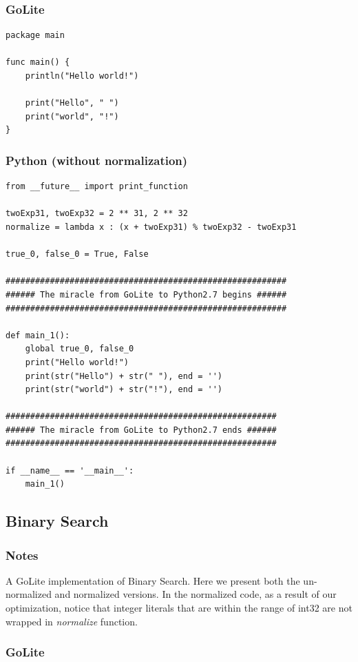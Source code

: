 \documentclass{article}
\begin{document}
\subsubsection{GoLite}
\begin{lstlisting}
package main

func main() {
    println("Hello world!")

    print("Hello", " ")
    print("world", "!")
}
\end{lstlisting}
\subsubsection{Python (without normalization)}
\begin{lstlisting}
from __future__ import print_function

twoExp31, twoExp32 = 2 ** 31, 2 ** 32
normalize = lambda x : (x + twoExp31) % twoExp32 - twoExp31

true_0, false_0 = True, False

#########################################################
###### The miracle from GoLite to Python2.7 begins ######
#########################################################

def main_1():
	global true_0, false_0
	print("Hello world!")
	print(str("Hello") + str(" "), end = '')
	print(str("world") + str("!"), end = '')

#######################################################
###### The miracle from GoLite to Python2.7 ends ######
#######################################################

if __name__ == '__main__':
	main_1()
\end{lstlisting}


\subsection{Binary Search}

\subsubsection{Notes}
A GoLite implementation of Binary Search. Here we present both the
un-normalized and normalized versions. In the normalized code, as a
result of our optimization, notice that integer literals that are
within the range of int32 are not wrapped in \textit{normalize} function.

\subsubsection{GoLite}
\end{document}
